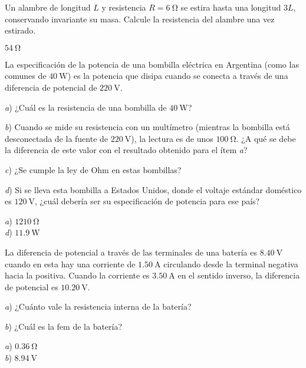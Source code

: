 \setcounter{figure}{0}
%
\begin{Exercise}
  Un alambre de longitud $L$ y resistencia $R = \SI{6}{\ohm}$ se estira hasta una longitud $3L$, conservando invariante su masa. Calcule la resistencia del alambre una vez estirado.
\end{Exercise}
\begin{Answer}
  $\SI{54}{\ohm}$
\end{Answer}
%
\begin{Exercise}
  La especificación de la potencia de una bombilla eléctrica en Argentina (como las comunes de $\SI{40}{\watt}$) es la potencia que disipa cuando se conecta a través de una diferencia de potencial de $\SI{220}{\volt}$.\par
  \textit{a}) ¿Cuál es la resistencia de una bombilla de $\SI{40}{\watt}$?\par
  \textit{b}) Cuando se mide su resistencia con un multímetro (mientras la bombilla está desconectada de la fuente de $\SI{220}{\volt}$), la lectura es de unos $\SI{100}{\ohm}$. ¿A qué se debe la diferencia de este valor con el resultado obtenido para el ítem \textit{a}?\par
  \textit{c}) ¿Se cumple la ley de Ohm en estas bombillas?\par
  \textit{d}) Si se lleva esta bombilla a Estados Unidos, donde el voltaje estándar doméstico es $\SI{120}{\volt}$, ¿cuál debería ser su especificación de potencia para ese país?
\end{Exercise}
\begin{Answer}
	\begin{minipage}[t]{.4\textwidth}
    \textit{a}) $\SI{1210}{\ohm}$\\ \textit{d}) $\SI{11.9}{\watt}$
  \end{minipage}
\end{Answer}
%
\begin{Exercise}
  La diferencia de potencial a través de las terminales de una batería es $\SI{8.40}{\volt}$ cuando en esta hay una corriente de $\SI{1.50}{\ampere}$ circulando desde la terminal negativa hacia la positiva. Cuando la corriente es $\SI{3.50}{\ampere}$ en el sentido inverso, la diferencia de potencial es $\SI{10.20}{\volt}$.\par
  \textit{a}) ¿Cuánto vale la resistencia interna de la batería?\par
  \textit{b}) ¿Cuál es la \textrm{fem} de la batería?
\end{Exercise}
\begin{Answer}
	\begin{minipage}[t]{.4\textwidth}
    \textit{a}) $\SI{0.36}{\ohm}$\\ \textit{b}) $\SI{8.94}{\volt}$
  \end{minipage}
\end{Answer}
